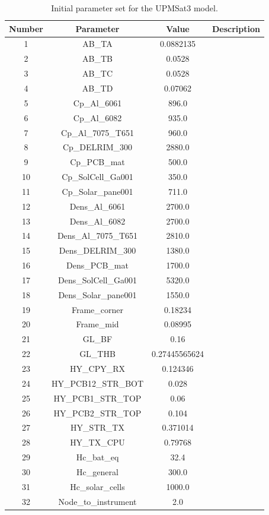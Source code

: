     \begin{table}[H]
        \centering
        \caption{Initial parameter set for the UPMSat3 model.}
        \label{tab:initialparamsUPMSat3}
    \begin{tabular}{cccc}
        \hline
        Number & Parameter & Value & Description \\
        \hline
        1 & AB\_TA & 0.0882135 &  \\
        2 & AB\_TB & 0.0528 &  \\
        3 & AB\_TC & 0.0528 &  \\
        4 & AB\_TD & 0.07062 &  \\
        5 & Cp\_Al\_6061 & 896.0 &  \\
        6 & Cp\_Al\_6082 & 935.0 &  \\
        7 & Cp\_Al\_7075\_T651 & 960.0 &  \\
        8 & Cp\_DELRIM\_300 & 2880.0 &  \\
        9 & Cp\_PCB\_mat & 500.0 &  \\
        10 & Cp\_SolCell\_Ga001 & 350.0 &  \\
        11 & Cp\_Solar\_pane001 & 711.0 &  \\
        12 & Dens\_Al\_6061 & 2700.0 &  \\
        13 & Dens\_Al\_6082 & 2700.0 &  \\
        14 & Dens\_Al\_7075\_T651 & 2810.0 &  \\
        15 & Dens\_DELRIM\_300 & 1380.0 &  \\
        16 & Dens\_PCB\_mat & 1700.0 &  \\
        17 & Dens\_SolCell\_Ga001 & 5320.0 &  \\
        18 & Dens\_Solar\_pane001 & 1550.0 &  \\
        19 & Frame\_corner & 0.18234 &  \\
        20 & Frame\_mid & 0.08995 &  \\
        21 & GL\_BF & 0.16 &  \\
        22 & GL\_THB & 0.27445565624 &  \\
        23 & HY\_CPY\_RX & 0.124346 &  \\
        24 & HY\_PCB12\_STR\_BOT & 0.028 &  \\
        25 & HY\_PCB1\_STR\_TOP & 0.06 &  \\
        26 & HY\_PCB2\_STR\_TOP & 0.104 &  \\
        27 & HY\_STR\_TX & 0.371014 &  \\
        28 & HY\_TX\_CPU & 0.79768 &  \\
        29 & Hc\_bat\_eq & 32.4 &  \\
        30 & Hc\_general & 300.0 &  \\
        31 & Hc\_solar\_cells & 1000.0 &  \\
        32 & Node\_to\_instrument & 2.0 &  \\

        \hline
        \end{tabular}
    \end{table}


